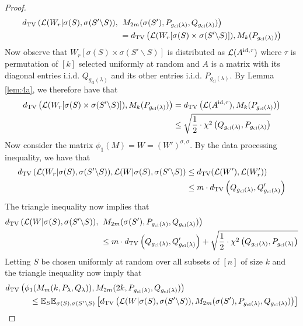 \begin{proof}
\begin{align*}
d_{\text{TV}}\left( \mathcal{L}(W_r|\sigma(S), \sigma(S' \backslash S)), \right. &\left. M_{2m}(\sigma(S'), P_{g_{\text{cl}}(\lambda)}, Q_{g_{\text{cl}}(\lambda)}) \right) \\
&= d_{\text{TV}}\left( \mathcal{L}(W_r[\sigma(S) \times \sigma(S' \backslash S)]), M_k(P_{g_{\text{cl}}(\lambda)}) \right)
\end{align*}
Now observe that $W_r[\sigma(S) \times \sigma(S' \backslash S)]$ is distributed as $\mathcal{L}(A^{\text{id}, \tau})$ where $\tau$ is permutation of $[k]$ selected uniformly at random and $A$ is a matrix with its diagonal entries i.i.d. $Q_{g_{\text{cl}}(\lambda)}$ and its other entries i.i.d. $P_{g_{\text{cl}}(\lambda)}$. By Lemma \ref{lem:4a}, we therefore have that
\begin{align*}
d_{\text{TV}}\left( \mathcal{L}(W_r[\sigma(S) \times \sigma(S' \backslash S)]), M_k(P_{g_{\text{cl}}(\lambda)}) \right) &= d_{\text{TV}}\left( \mathcal{L}(A^{\text{id}, \tau}), M_k(P_{g_{\text{cl}}(\lambda)}) \right) \\
&\le \sqrt{\frac{1}{2} \cdot \chi^2\left( Q_{g_{\text{cl}}(\lambda)}, P_{g_{\text{cl}}(\lambda)}\right)}
\end{align*}
Now consider the matrix $\phi_1(M) = W = (W')^{\sigma, \sigma}$. By the data processing inequality, we have that
\begin{align*}
d_{\text{TV}}\left( \mathcal{L}(W_r|\sigma(S), \sigma(S' \backslash S)), \mathcal{L}(W|\sigma(S), \sigma(S' \backslash S)\right) &\le d_{\text{TV}}(\mathcal{L}(W'), \mathcal{L}(W_r')) \\
&\le m \cdot d_{\text{TV}}\left( Q_{g_{\text{cl}}(\lambda)}, Q'_{g_{\text{cl}}(\lambda)} \right)
\end{align*}
The triangle inequality now implies that
\begin{align*}
d_{\text{TV}}\left( \mathcal{L}(W|\sigma(S), \sigma(S' \backslash S)), \right. &\left. M_{2m}(\sigma(S'), P_{g_{\text{cl}}(\lambda)}, Q_{g_{\text{cl}}(\lambda)}) \right) \\
&\le m \cdot d_{\text{TV}}\left( Q_{g_{\text{cl}}(\lambda)}, Q'_{g_{\text{cl}}(\lambda)} \right) + \sqrt{\frac{1}{2} \cdot \chi^2\left( Q_{g_{\text{cl}}(\lambda)}, P_{g_{\text{cl}}(\lambda)}\right)}
\end{align*}
Letting $S$ be chosen uniformly at random over all subsets of $[n]$ of size $k$ and the triangle inequality now imply that
\begin{align*}
&\TV\left( \phi_1(M_m(k, P_{\lambda}, Q_{\lambda})), M_{2m}(2k, P_{g_{\text{cl}}(\lambda)}, Q_{g_{\text{cl}}(\lambda)}) \right) \\
&\quad \quad \quad \le \bE_{S} \bE_{\sigma(S), \sigma(S'\backslash S)} \left[ \TV\left( \mL(W|\sigma(S), \sigma(S' \backslash S)), M_{2m}(\sigma(S'), P_{g_{\text{cl}}(\lambda)}, Q_{g_{\text{cl}}(\lambda)}) \right) \right] \\

\end{align*}
\end{proof}
